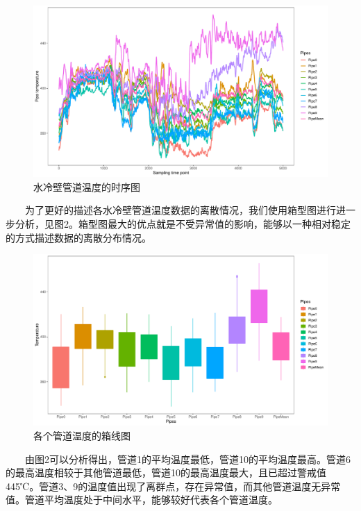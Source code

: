 \documentclass[
]{article}
\begin{document}
\begin{figure}

{\centering \includegraphics{TJRJCP_DuXingx_202105_files/figure-latex/unnamed-chunk-8-1} 

}

\caption{水冷壁管道温度的时序图}\label{fig:unnamed-chunk-8}
\end{figure}

  为了更好的描述各水冷壁管道温度数据的离散情况，我们使用箱型图进行进一步分析，见图2。箱型图最大的优点就是不受异常值的影响，能够以一种相对稳定的方式描述数据的离散分布情况。

\begin{figure}

{\centering \includegraphics{TJRJCP_DuXingx_202105_files/figure-latex/unnamed-chunk-9-1} 

}

\caption{各个管道温度的箱线图}\label{fig:unnamed-chunk-9}
\end{figure}

  由图2可以分析得出，管道1的平均温度最低，管道10的平均温度最高。管道6的最高温度相较于其他管道最低，管道10的最高温度最大，且已超过警戒值445℃。管道3、9的温度值出现了离群点，存在异常值，而其他管道温度无异常值。管道平均温度处于中间水平，能够较好代表各个管道温度。
\end{document}
